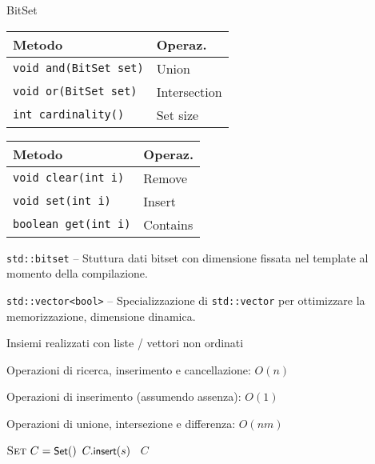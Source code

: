 \begin{frame}{BitSet}


\medskip
{\footnotesize
\begin{tabular}{|l|l|}
\hline
\textbf{Metodo} & \textbf{Operaz.} \\\hline
\texttt{void and(BitSet set)} & Union \\\hline
\texttt{void or(BitSet set)} & Intersection \\\hline
\texttt{int cardinality()} & Set size \\\hline
\end{tabular}
\hfill
\begin{tabular}{|l|l|}
\hline
\textbf{Metodo} & \textbf{Operaz.} \\\hline
\texttt{void clear(int i)} & Remove \\\hline
\texttt{void set(int i)} & Insert \\\hline
\texttt{boolean get(int i)} & Contains \\\hline
\end{tabular}
}

\bigskip
{}

\BI
\item \alert{\texttt{std::bitset}} -- 
Stuttura dati bitset con dimensione fissata nel template al momento della compilazione.
\item \alert{\texttt{std::vector<bool>}} --
Specializzazione di \texttt{std::vector} per ottimizzare la memorizzazione, dimensione dinamica.
\EI


\end{frame}



\begin{frame}{Insiemi realizzati con liste / vettori non ordinati}
	
\begin{myboxtitle}
\BI
\item Operazioni di ricerca, inserimento e cancellazione: \alert{$O(n)$}
\item Operazioni di inserimento (assumendo assenza): \alert{$O(1)$}
\item Operazioni di unione, intersezione e differenza: \alert{$O(nm)$}
\EI
\end{myboxtitle}


\begin{Procedure}
\caption[A]{\Set\ \setdifference($\Set\ A, \Set\ B$)}

  $\textsc{Set}\ C = \textsf{{\small Set}}()$\;
  {
    {
       $C.\textsf{{\small insert}}(s)$\;
    }
  }
  \Return\ $C$\;
\end{Procedure}
	

	
\end{frame}


